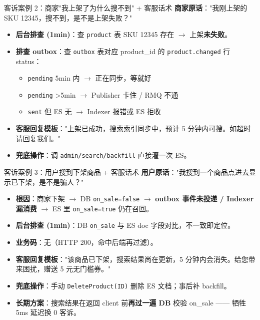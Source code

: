 \documentclass[aspectratio=169,11pt]{beamer}
\begin{document}
\begin{frame}[shrink]{客诉案例 2：商家"我上架了为什么搜不到" + 客服话术}
\textbf{商家原话}："我刚上架的 SKU 12345，搜不到，是不是上架失败？"
\vspace{2mm}
\begin{itemize}
  \item \textbf{后台排查 (1min)}：查 \texttt{product} 表 SKU 12345 存在 $\to$ 上架\textbf{未失败}。
  \item \textbf{排查 outbox}：查 \texttt{outbox} 表对应 product\_id 的 \texttt{product.changed} 行 status：
        \begin{itemize}\item \texttt{pending} 5min 内 $\to$ 正在同步，等就好\item \texttt{pending} \textgreater 5min $\to$ Publisher 卡住 / RMQ 不通\item \texttt{sent} 但 ES 无 $\to$ Indexer 报错或 ES 拒收\end{itemize}
  \item \textbf{客服回复模板}："上架已成功，搜索索引同步中，预计 5 分钟内可搜。如超时请回复我们。"
  \item \textbf{兜底操作}：调 \texttt{admin/search/backfill} 直接灌一次 ES。
\end{itemize}
\end{frame}

\begin{frame}[shrink]{客诉案例 3：用户搜到下架商品 + 客服话术}
\textbf{用户原话}："我搜到一个商品点进去显示已下架，是不是骗人？"
\vspace{2mm}
\begin{itemize}
  \item \textbf{根因}：商家下架 $\to$ DB \texttt{on\_sale=false} $\to$ \textbf{outbox 事件未投递 / Indexer 漏消费} $\to$ ES 里 \texttt{on\_sale=true} 仍在召回。
  \item \textbf{后台排查 (1min)}：DB \texttt{on\_sale} 与 ES doc 字段对比，不一致即定位。
  \item \textbf{业务码}：无（HTTP 200，命中后端再过滤）。
  \item \textbf{客服回复模板}："该商品已下架，搜索结果尚在更新，5 分钟内会消失。给您带来困扰，赠送 5 元无门槛券。"
  \item \textbf{兜底操作}：手动 \texttt{DeleteProduct(ID)} 删除 ES 文档；事后补 backfill。
  \item \textbf{长期方案}：搜索结果在返回 client 前\textbf{再过一遍 DB} 校验 on\_sale —— 牺牲 5ms 延迟换 0 客诉。
\end{itemize}
\end{frame}
\end{document}
